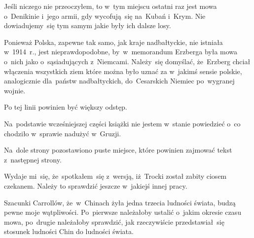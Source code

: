 \documentclass[a4paper,11pt]{article}
\numberwithin{equation}{section}
\begin{document}
\VerSpaceFour





\noindent
{} Jeśli niczego nie przeoczyłem, to w~tym miejscu ostatni raz jest
mowa o~Denikinie i~jego armii, gdy wycofują~się na~Kubań i~Krym. Nie
dowiadujemy~się tym samym jakie były ich dalsze losy.

\VerSpaceFour





\noindent
{} Ponieważ Polska, zapewne tak samo, jak kraje nadbałtyckie, nie
istniała w~1914~r., jest nieprawdopodobne, by~w~memorandum Erzberga była
mowa o~nich jako o~sąsiadujących z~Niemcami. Należy~się domyślać,
że~Erzberg chciał włączenia wszystkich ziem które można było uznać za
w~jakimś sensie polskie, analogicznie dla~państw nadbałtyckich,
do~Cesarskich Niemiec po~wygranej wojnie.

\VerSpaceFour





\noindent
{} Po tej linii powinien być większy odstęp.

\VerSpaceFour





\noindent
{} Na~podstawie wcześniejszej części książki nie jestem
w~stanie powiedzieć o~co chodziło w~sprawie nadużyć w~Gruzji.

\VerSpaceFour





\noindent
{} Na~dole strony pozostawiono puste miejsce, które powinien
zajmować tekst z~następnej strony.

\VerSpaceFour





\noindent
{} Wydaje mi~się, że~spotkałem~się z~wersją, iż~Trocki
został zabity ciosem czekanem. Należy to sprawdzić jeszcze w~jakiejś innej
pracy.

\VerSpaceFour





\noindent
{} Szacunki Carrollów, że~w~Chinach żyła jedna trzecia
ludności świata, budzą pewne moje wątpliwości. Po~pierwsze należałoby
ustalić o~jakim okresie czasu mowa, po~drugie należałoby sprawdzić, jak
rzeczywiście przedstawiał~się stosunek ludności Chin do ludności świata.
\end{document}
